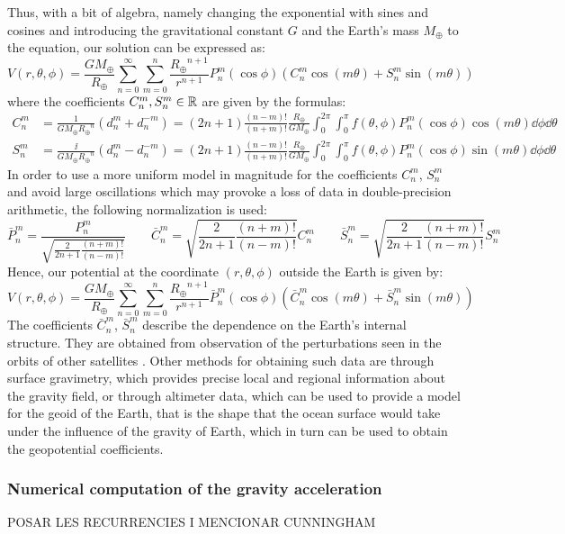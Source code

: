 \documentclass[../main.tex]{subfiles}
\begin{document}
Thus, with a bit of algebra, namely changing the exponential with sines and cosines and introducing the gravitational constant $G$ and the Earth's mass $M_\oplus$ to the equation, our solution can be expressed as:
\begin{equation}
  V(r,\theta,\phi) = \frac{GM_\oplus}{R_\oplus}\sum_{n=0}^\infty \sum_{m=0}^n\frac{{R_\oplus}^{n+1}}{r^{n+1}}P_n^m(\cos\phi) (C_n^m\cos(m\theta)+S_n^m\sin(m\theta))
\end{equation}
where the coefficients $C_n^m,S_n^m\in\mathbb{R}$ are given by the formulas:
\begin{align}
  C_n^m & = \frac{1}{G M_\oplus {R_\oplus}^n}(d_n^m+d_n^{-m})=(2n+1)\frac{(n-m)!}{(n+m)!}\frac{R_\oplus}{G M_\oplus}\int_0^{2\pi}\int_0^\pi f(\theta,\phi) P_{n}^{m}(\cos\phi)\cos(m\theta)\dd{\phi}\dd{\theta}   \\
  S_n^m & = \frac{\ii}{G M_\oplus {R_\oplus}^n}(d_n^m-d_n^{-m})=(2n+1)\frac{(n-m)!}{(n+m)!}\frac{R_\oplus}{G M_\oplus}\int_0^{2\pi}\int_0^\pi f(\theta,\phi) P_{n}^{m}(\cos\phi)\sin(m\theta)\dd{\phi}\dd{\theta}
\end{align}
In order to use a more uniform model in magnitude for the coefficients $C_n^m$, $S_n^m$ and avoid large oscillations which may provoke a loss of data in double-precision arithmetic, the following normalization is used:
\begin{equation}
  \bar{P}_n^m=\frac{P_n^m}{\sqrt{\frac{2}{2n+1}\frac{(n+m)!}{(n-m)!}}}\qquad \bar{C}_n^m=\sqrt{\frac{2}{2n+1}\frac{(n+m)!}{(n-m)!}}C_n^m\qquad \bar{S}_n^m=\sqrt{\frac{2}{2n+1}\frac{(n+m)!}{(n-m)!}}S_n^m
\end{equation}
Hence, our potential at the coordinate $(r,\theta,\phi)$ outside the Earth is given by:
\begin{equation}
  V(r,\theta,\phi) = \frac{GM_\oplus}{R_\oplus}\sum_{n=0}^\infty \sum_{m=0}^n\frac{{R_\oplus}^{n+1}}{r^{n+1}}\bar{P}_n^m(\cos\phi) (\bar{C}_n^m\cos(m\theta)+\bar{S}_n^m\sin(m\theta))
\end{equation}
The coefficients $\bar{C}_n^m$, $\bar{S}_n^m$ describe the dependence on the Earth's internal structure. They are obtained from observation of the perturbations seen in the orbits of other satellites \cite{montenbruck}. Other methods for obtaining such data are through surface gravimetry, which provides precise local and regional information about the gravity field, or through altimeter data, which can be used to provide a model for the geoid of the Earth, that is the shape that the ocean surface would take under the influence of the gravity of Earth, which in turn can be used to obtain the geopotential coefficients.
\subsubsection{Numerical computation of the gravity acceleration}
POSAR LES RECURRENCIES I MENCIONAR CUNNINGHAM
\end{document}
